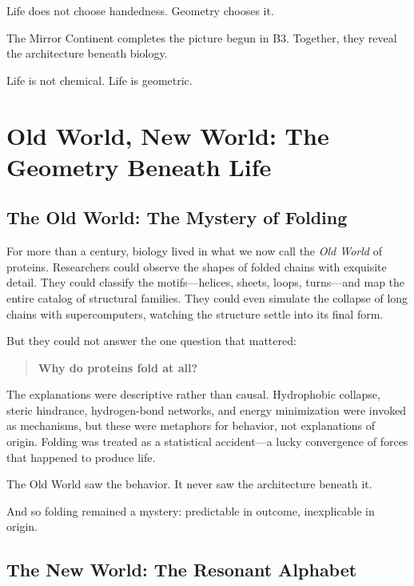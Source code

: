 \documentclass[11pt, letterpaper, openany]{book}
\begin{document}
Life does not choose handedness.  
Geometry chooses it.

The Mirror Continent completes the picture begun in B3.  
Together, they reveal the architecture beneath biology.

Life is not chemical.  
Life is geometric.


\chapter{Old World, New World: The Geometry Beneath Life}

\section*{The Old World: The Mystery of Folding}

For more than a century, biology lived in what we now call the \textit{Old World} of
proteins. Researchers could observe the shapes of folded chains with exquisite
detail. They could classify the motifs---helices, sheets, loops, turns---and map
the entire catalog of structural families. They could even simulate the collapse
of long chains with supercomputers, watching the structure settle into its final
form.

But they could not answer the one question that mattered:

\begin{quote}
\textbf{Why do proteins fold at all?}
\end{quote}

The explanations were descriptive rather than causal. Hydrophobic collapse,
steric hindrance, hydrogen-bond networks, and energy minimization were invoked
as mechanisms, but these were metaphors for behavior, not explanations of
origin. Folding was treated as a statistical accident---a lucky convergence of
forces that happened to produce life.

The Old World saw the behavior.  
It never saw the architecture beneath it.

And so folding remained a mystery: predictable in outcome, inexplicable in
origin.

\section*{The New World: The Resonant Alphabet}
\end{document}
